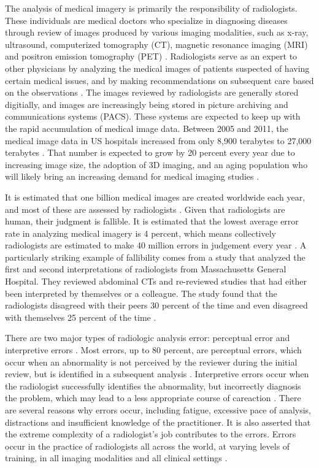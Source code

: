 \documentclass[sigconf]{acmart}
\begin{document}
The analysis of medical imagery is primarily the responsibility of radiologists. These individuals are medical doctors who specialize in diagnosing diseases through review of images produced by various imaging modalities, such as x-ray, ultrasound, computerized tomography (CT), magnetic resonance imaging (MRI) and positron emission tomography (PET) \cite{cite00}. Radiologists serve as an expert to other physicians by analyzing the medical images of patients suspected of having certain medical issues, and by making recommendations on subsequent care based on the observations \cite{cite00}. The images reviewed by radiologists are generally stored digitially, and images are increasingly being stored in picture archiving and communications systems (PACS). These systems are expected to keep up with the rapid accumulation of medical image data. Between 2005 and 2011, the medical image data in US hospitals increased from only 8,900 terabytes to 27,000 terabytes \cite{cite04}. That number is expected to grow by 20 percent every year due to increasing image size, the adoption of 3D imaging, and an aging population who will likely bring an increasing demand for medical imaging studies \cite{cite04}.

It is estimated that one billion medical images are created worldwide each year, and most of these are assessed by radiologists \cite{cite01}. Given that radiologists are human, their judgment is fallible. It is estimated that the lowest average error rate in analyzing medical imagery is 4 percent, which means collectively radiologists are estimated to make 40 million errors in judgement every year \cite{cite01}. A particularly striking example of fallibility comes from a study that analyzed the first and second interpretations of radiologists from Massachusetts General Hospital. They reviewed abdominal CTs and re-reviewed studies that had either been interpreted by themselves or a colleague. The study found that the radiologists disagreed with their peers 30 percent of the time and even disagreed with themselves 25 percent of the time \cite{cite01}.

There are two major types of radiologic analysis error: perceptual error and interpretive errors \cite{cite01}. Most errors, up to 80 percent, are perceptual errors, which occur when an abnormality is not perceived by the reviewer during the initial review, but is identified in a subsequent analysis \cite{cite01}. Interpretive errors occur when the radiologist successfully identifies the abnormality, but incorrectly diagnosis the problem, which may lead to a less appropriate course of careaction \cite{cite01}. There are several reasons why errors occur, including fatigue, excessive pace of analysis, distractions and insufficient knowledge of the practitioner. It is also asserted that the extreme complexity of a radiologist's job contributes to the errors. Errors occur in the practice of radiologists all across the world, at varying levels of training, in all imaging modalities and all clinical settings \cite{cite01}.
\end{document}
